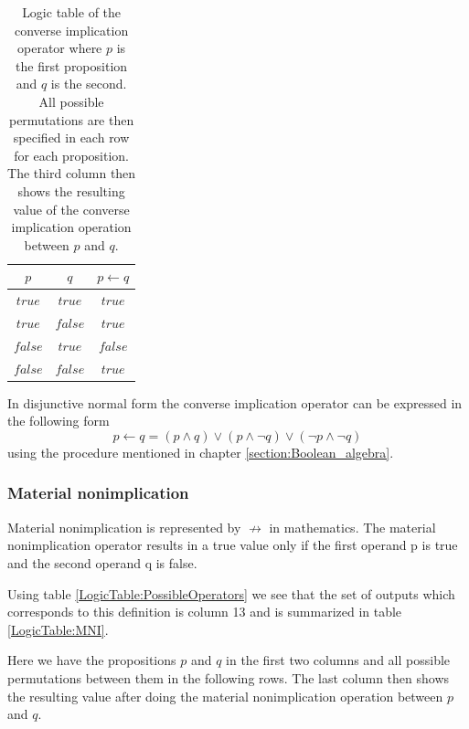         \begin{table}[h!]
            \centering
            \begin{tabular}{|c|c|c|}
            	\hline
            	  $p$   &   $q$   & $p \leftarrow q$ \\ \hline
            	$true$  & $true$  &      $true$      \\ \hline
            	$true$  & $false$ &      $true$      \\ \hline
            	$false$ & $true$  &     $false$      \\ \hline
            	$false$ & $false$ &      $true$      \\ \hline
            \end{tabular}
            \caption{Logic table of the converse implication operator where $p$ is the first proposition and $q$ is the second. All possible permutations are then specified in each row for each proposition. The third column then shows the resulting value of the converse implication operation between $p$ and $q$.}
            \label{LogicTable:CI}
        \end{table}
        
        In disjunctive normal form the converse implication operator can be expressed in the following form
        \begin{equation}
            p \leftarrow q = (p \wedge  q) \vee (p \wedge \neg q) \vee (\neg p \wedge \neg q)
        \end{equation}
        using the procedure mentioned in chapter \ref{section:Boolean_algebra}.
    
    \subsubsection{Material nonimplication}
        Material nonimplication is represented by $\not\rightarrow$ in mathematics. The material nonimplication operator results in a true value only if the first operand p is true and the second operand q is false.
        
        Using table \ref{LogicTable:PossibleOperators} we see that the set of outputs which corresponds to this definition is column 13 and is summarized in table \ref{LogicTable:MNI}.
        
        Here we have the propositions $p$ and $q$ in the first two columns and all possible permutations between them in the following rows. The last column then shows the resulting value after doing the material nonimplication operation between $p$ and $q$.
        
